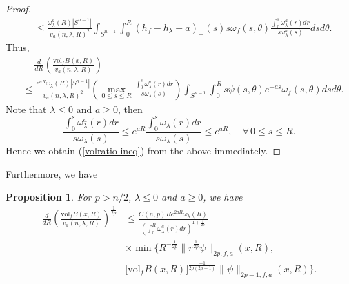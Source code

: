 \documentclass[11pt]{amsart}
\numberwithin{equation}{section}
\newtheorem{proposition}[theorem]{Proposition}
\newcommand{\vol}{\mathrm{vol}}
\begin{document}
\begin{proof}
\begin{align*}
	&\leq \frac{\omega_\lambda^a(R)|S^{n-1}|}{v_a(n,\lambda,R)^2}\int_{S^{n-1}}\int_{0}^R(h_f-h_\lambda-a)_+(s)s\omega_f(s,\theta)\frac{\int_{0}^{s}\omega^a_\lambda(r)dr}{s\omega^a_\lambda(s)}dsd\theta.
\end{align*}
Thus,
\begin{align*}
		&\quad\,\frac{d}{dR}\left(\frac{\vol_fB(x,R)}{v_a(n,\lambda,R)}\right)\\&\leq \frac{e^{aR}\omega_\lambda(R)|S^{n-1}|}{v_a(n,\lambda,R)^2}\left(\max_{0\leq s\leq R}\frac{\int_{0}^{s}\omega_\lambda^a(r)dr}{s\omega_\lambda(s)}\right)\int_{S^{n-1}}\int_{0}^Rs\psi(s,\theta) e^{-as} \omega_f(s,\theta)dsd\theta.
	\end{align*}
Note that $\lambda\leq 0$ and $a\geq 0$, then 
\[
\frac{\int_{0}^{s}\omega_\lambda^a(r)dr}{s\omega_\lambda(s)}\leq e^{aR}\frac{\int_0^s\omega_\lambda(r)dr}{s\omega_\lambda(s)}\leq e^{aR},\quad \forall \,0\leq s\leq R.
\]
Hence we obtain (\ref{volratio-ineq}) from the above immediately.
\end{proof}

Furthermore, we have

\begin{proposition}\label{reduce}
	For $p>n/2$, $\lambda\leq 0$ and $a\geq 0$, we have
	\begin{equation}
		\begin{aligned}
			\frac{d}{dR}\left(\frac{\vol_fB(x,R)}{v_a(n,\lambda,R)}\right)^\frac{1}{2p}&\leq \frac{C(n,p)Re^{2aR}\omega_\lambda(R)}{\left(\int_{0}^R\omega^a_\lambda(r)dr\right)^{1+\frac{1}{2p}}}\\
			&\times\min\bigg\{R^{-\frac{1}{2p}}\|r^{\frac{1}{2p}}\psi\|_{2p,f,a}(x,R),\\
			&\big[\vol_fB(x,R)\big]^{\frac{-1}{2p(2p-1)}}\|\psi\|_{2p-1,f,a}(x,R)\bigg\}. \label{reduce-ineq}
		\end{aligned}
	\end{equation}
\end{proposition}
\end{document}
